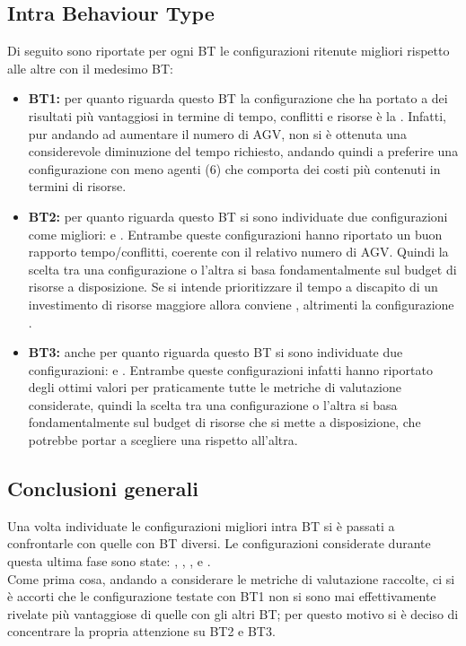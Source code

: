 \documentclass[12pt]{article}
\begin{document}
\subsection{Intra Behaviour Type}
Di seguito sono riportate per ogni BT le configurazioni ritenute migliori rispetto alle altre con il medesimo BT: 
\begin{itemize}
\item \textbf{BT1:} per quanto riguarda questo BT la configurazione che ha portato a dei risultati più vantaggiosi in termine di tempo, conflitti e risorse è la . Infatti, pur andando ad aumentare il numero di AGV, non si è ottenuta una considerevole diminuzione del tempo richiesto, andando quindi a preferire una configurazione con meno agenti (6) che comporta dei costi più contenuti in termini di risorse.

\item \textbf{BT2:} per quanto riguarda questo BT si sono individuate due configurazioni come migliori:  e . Entrambe queste configurazioni hanno riportato un buon rapporto tempo/conflitti, coerente con il relativo numero di AGV. Quindi la scelta tra una configurazione o l'altra si basa fondamentalmente sul budget di risorse a disposizione. Se si intende prioritizzare il tempo a discapito di un investimento di risorse maggiore allora conviene , altrimenti la configurazione . 

\item \textbf{BT3:} anche per quanto riguarda questo BT si sono individuate due configurazioni:  e . Entrambe queste configurazioni infatti hanno riportato degli ottimi valori per praticamente tutte le metriche di valutazione considerate, quindi la scelta tra una configurazione o l'altra si basa fondamentalmente sul budget di risorse che si mette a disposizione, che potrebbe portar a scegliere una rispetto all'altra.
\end{itemize}

\subsection{Conclusioni generali}
Una volta individuate le configurazioni migliori intra BT si è passati a confrontarle con quelle con BT diversi. Le configurazioni considerate durante questa ultima fase sono state: , , ,  e .\\
\noindent Come prima cosa, andando a considerare le metriche di valutazione raccolte, ci si è accorti che le configurazione testate con BT1 non si sono mai effettivamente rivelate più vantaggiose di quelle con gli altri BT; per questo motivo si è deciso di concentrare la propria attenzione su BT2 e BT3. \\
\end{document}
